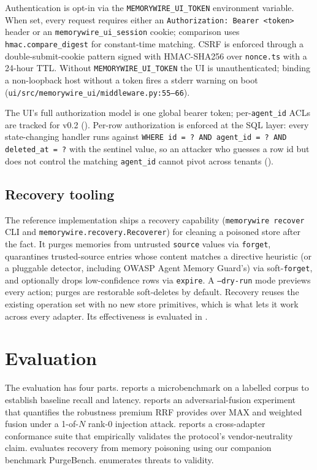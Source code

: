 \documentclass[11pt,letterpaper,twocolumn]{article}
\begin{document}
Authentication is opt-in via the \texttt{MEMORYWIRE\_UI\_TOKEN} environment variable. When set, every request requires either an \texttt{Authorization: Bearer <token>} header or an \texttt{memorywire\_ui\_session} cookie; comparison uses \texttt{hmac.compare\_digest} for constant-time matching. CSRF is enforced through a double-submit-cookie pattern signed with HMAC-SHA256 over \texttt{nonce.ts} with a 24-hour TTL. Without \texttt{MEMORYWIRE\_UI\_TOKEN} the UI is unauthenticated; binding a non-loopback host without a token fires a stderr warning on boot (\texttt{ui/src/memorywire\_ui/middleware.py:55--66}).

The UI's full authorization model is one global bearer token; per-\texttt{agent\_id} ACLs are tracked for v0.2 (). Per-row authorization is enforced at the SQL layer: every state-changing handler runs against \texttt{WHERE id = ? AND agent\_id = ? AND deleted\_at = ?} with the sentinel value, so an attacker who guesses a row id but does not control the matching \texttt{agent\_id} cannot pivot across tenants ().

\subsection{Recovery tooling}
\label{sec:impl-recovery}

The reference implementation ships a recovery capability (\texttt{memorywire recover} CLI and \texttt{memorywire.recovery.Recoverer}) for cleaning a poisoned store after the fact. It purges memories from untrusted \texttt{source} values via \texttt{forget}, quarantines trusted-source entries whose content matches a directive heuristic (or a pluggable detector, including OWASP Agent Memory Guard's) via soft-\texttt{forget}, and optionally drops low-confidence rows via \texttt{expire}. A \texttt{--dry-run} mode previews every action; purges are restorable soft-deletes by default. Recovery reuses the existing operation set with no new store primitives, which is what lets it work across every adapter. Its effectiveness is evaluated in .

\section{Evaluation}
\label{sec:eval}

The evaluation has four parts.  reports a microbenchmark on a labelled corpus to establish baseline recall and latency.  reports an adversarial-fusion experiment that quantifies the robustness premium RRF provides over MAX and weighted fusion under a 1-of-$N$ rank-0 injection attack.  reports a cross-adapter conformance suite that empirically validates the protocol's vendor-neutrality claim.  evaluates recovery from memory poisoning using our companion benchmark PurgeBench.  enumerates threats to validity.
\end{document}
